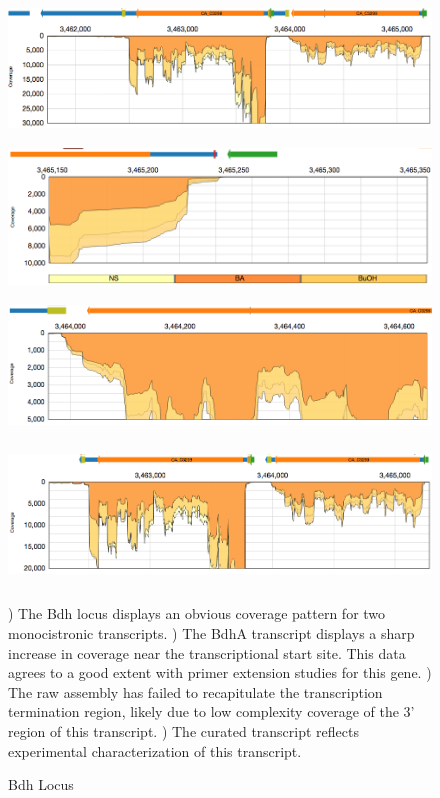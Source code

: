 \begin{figure}
{\includegraphics[width=\textwidth,height=1.5in]{images/Assembly/Examples/Bdh/Bdh-locus.png}
\label{fig:5a}}
{\includegraphics[width=\textwidth,height=1.5in]{images/Assembly/Examples/Bdh/BdhA-TSS.png}
\label{fig:5b}}
{\includegraphics[width=\textwidth,height=1.5in]{images/Assembly/Examples/Bdh/BdhA-termination.png}
\label{fig:5c}}
{\includegraphics[width=\textwidth,height=1.5in]{images/Assembly/Examples/Bdh/Bdh-curated.png}
\label{fig:5d}}
\caption{Bdh Locus}
) The Bdh locus displays an obvious coverage pattern for two monocistronic transcripts. ) The BdhA transcript displays a sharp increase in coverage near the transcriptional start site. This data agrees to a good extent with primer extension studies for this gene. ) The raw assembly has failed to recapitulate the transcription termination region, likely due to low complexity coverage of the 3' region of this transcript. ) The curated transcript reflects experimental characterization of this transcript\cite{73}.
\end{figure}

